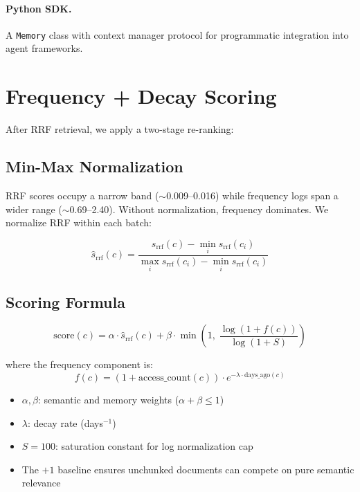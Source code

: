 \documentclass[11pt,a4paper]{article}
\begin{document}
\paragraph{Python SDK.}  A \texttt{Memory} class with context
manager protocol for programmatic integration into agent
frameworks.


\section{Frequency + Decay Scoring}
\label{sec:scoring}

After RRF retrieval, we apply a two-stage re-ranking:

\subsection{Min-Max Normalization}

RRF scores occupy a narrow band ($\sim$0.009--0.016) while frequency
logs span a wider range ($\sim$0.69--2.40).  Without normalization,
frequency dominates.  We normalize RRF within each batch:

\begin{equation}
  \hat{s}_{\text{rrf}}(c) =
    \frac{s_{\text{rrf}}(c) - \min_i s_{\text{rrf}}(c_i)}
         {\max_i s_{\text{rrf}}(c_i) - \min_i s_{\text{rrf}}(c_i)}
  \label{eq:normalize}
\end{equation}

\subsection{Scoring Formula}

\begin{equation}
  \text{score}(c) = \alpha \cdot \hat{s}_{\text{rrf}}(c) +
    \beta \cdot \min\!\left(1,\;
    \frac{\log(1 + f(c))}{\log(1 + S)}\right)
  \label{eq:scoring}
\end{equation}

\noindent where the frequency component is:
\begin{equation}
  f(c) = (1 + \text{access\_count}(c)) \cdot
    e^{-\lambda \cdot \text{days\_ago}(c)}
  \label{eq:freq}
\end{equation}

\begin{itemize}
  \item $\alpha, \beta$: semantic and memory weights ($\alpha + \beta \leq 1$)
  \item $\lambda$: decay rate (days$^{-1}$)
  \item $S = 100$: saturation constant for log normalization cap
  \item The $+1$ baseline ensures unchunked documents can compete on
    pure semantic relevance
\end{itemize}
\end{document}
